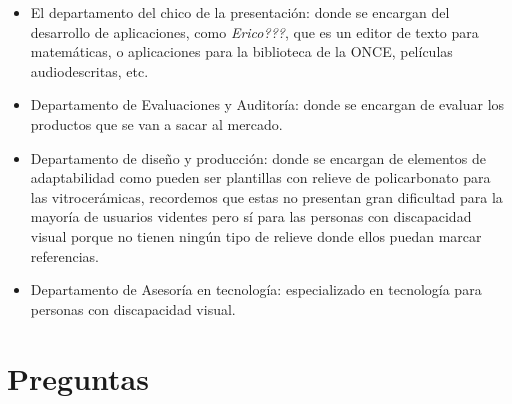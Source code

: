 \documentclass{article}
\begin{document}
	\begin{itemize}
		\item El departamento del chico de la presentación: donde se encargan del desarrollo de aplicaciones, como \textit{Erico???}, que es un editor de texto para matemáticas, o aplicaciones para la biblioteca de la ONCE, películas audiodescritas, etc.
		\item Departamento de Evaluaciones y Auditoría: donde se encargan de evaluar los productos que se van a sacar al mercado.
		\item Departamento de diseño y producción: donde se encargan de elementos de adaptabilidad como pueden ser plantillas con relieve de policarbonato para las vitrocerámicas, recordemos que estas no presentan gran dificultad para la mayoría de usuarios videntes pero sí para las personas con discapacidad visual porque no tienen ningún tipo de relieve donde ellos puedan marcar referencias.
		\item Departamento de Asesoría en tecnología: especializado en tecnología para personas con discapacidad visual.
	\end{itemize}
	
	
	\section{Preguntas}
	
\end{document}
